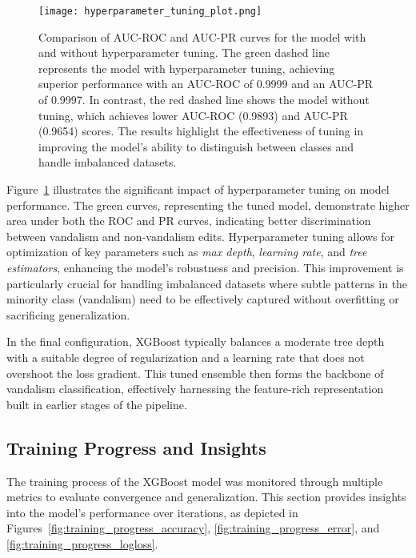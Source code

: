 \documentclass[
    13pt, %
    a4paper, %
    listof=totoc, %
    bibliography=totoc, %
    index=totoc, %
    headsepline
]{scrreprt}
\begin{document}
\noindent
\begin{figure}[htbp]
    \centering
    \texttt{[image: hyperparameter\_tuning\_plot.png]}
    \caption{Comparison of AUC-ROC and AUC-PR curves for the model with and without hyperparameter tuning. The green dashed line represents the model with hyperparameter tuning, achieving superior performance with an AUC-ROC of 0.9999 and an AUC-PR of 0.9997. In contrast, the red dashed line shows the model without tuning, which achieves lower AUC-ROC (0.9893) and AUC-PR (0.9654) scores. The results highlight the effectiveness of tuning in improving the model's ability to distinguish between classes and handle imbalanced datasets.}
    \label{fig:hyperparam_tuning_plot}
\end{figure}

\noindent
Figure~\ref{fig:hyperparam_tuning_plot} illustrates the significant impact of hyperparameter tuning on model performance. The green curves, representing the tuned model, demonstrate higher area under both the ROC and PR curves, indicating better discrimination between vandalism and non-vandalism edits. Hyperparameter tuning allows for optimization of key parameters such as \textit{max depth}, \textit{learning rate}, and \textit{tree estimators}, enhancing the model's robustness and precision. This improvement is particularly crucial for handling imbalanced datasets where subtle patterns in the minority class (vandalism) need to be effectively captured without overfitting or sacrificing generalization.

In the final configuration, XGBoost typically balances a moderate tree depth with a suitable degree of regularization and a learning rate that does not overshoot the loss gradient. This tuned ensemble then forms the backbone of vandalism classification, effectively harnessing the feature-rich representation built in earlier stages of the pipeline.

\subsection{Training Progress and Insights}
\label{subsec:training_progress}

The training process of the XGBoost model was monitored through multiple metrics to evaluate convergence and generalization. This section provides insights into the model's performance over iterations, as depicted in Figures~\ref{fig:training_progress_accuracy}, \ref{fig:training_progress_error}, and \ref{fig:training_progress_logloss}.
\end{document}
